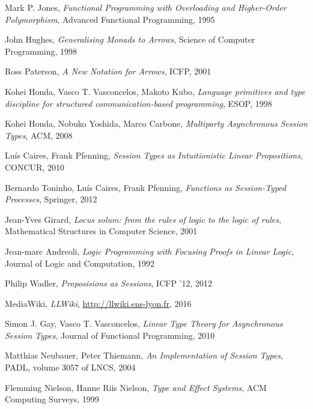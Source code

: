 \documentclass{article}
\begin{document}
\begin{thebibliography}{99}
    Mark P. Jones,
    \emph{Functional Programming with
      Overloading and Higher-Order Polymorphism},
    Advanced Functional Programming,
    1995

    John Hughes,
    \emph{Generalising Monads to Arrows},
    Science of Computer Programming,
    1998

    Ross Paterson,
    \emph{A New Notation for Arrows},
    ICFP,
    2001

    Kohei Honda, Vasco T. Vasconcelos, Makoto Kubo,
    \emph{Language primitives and type discipline for structured
      communication-based programming},
    ESOP,
    1998

    Kohei Honda, Nobuko Yoshida, Marco Carbone,
    \emph{Multiparty Asynchronous Session Types},
    ACM,
    2008

    Lu\'is Caires, Frank Pfenning,
    \emph{Session Types as Intuitionistic Linear Propositions},
    CONCUR,
    2010

    Bernardo Toninho, Lu\'is Caires, Frank Pfenning,
    \emph{Functions as Session-Typed Processes},
    Springer,
    2012

    Jean-Yves Girard,
    \emph{Locus solum: from the rules of logic to the logic of rules},
    Mathematical Structures in Computer Science,
    2001

    Jean-marc Andreoli,
    \emph{Logic Programming with Focusing Proofs in Linear Logic},
    Journal of Logic and Computation,
    1992

    Philip Wadler,
    \emph{Proposisions as Sessions},
    ICFP '12,
    2012

    MediaWiki,
    \emph{LLWiki},
    \url{http://llwiki.ens-lyon.fr},
    2016

    Simon J. Gay, Vasco T. Vasconcelos,
    \emph{Linear Type Theory for Asynchronous Session Types},
    Journal of Functional Programming,
    2010

    Matthias Neubauer, Peter Thiemann,
    \emph{An Implementation of Session Types},
    PADL, volume 3057 of LNCS,
    2004

    Flemming Nielson, Hanne Riis Nielson,
    \emph{Type and Effect Systems},
    ACM Computing Surveys,
    1999


\end{thebibliography}
\end{document}
